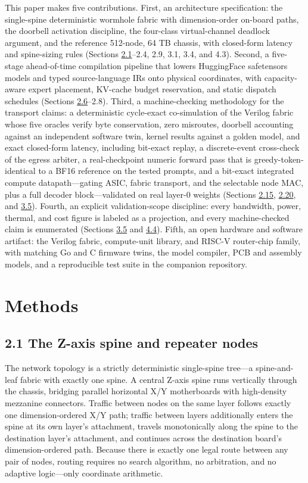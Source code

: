 \documentclass[12pt,onecolumn]{article}
\begin{document}
This paper makes five contributions. First, an architecture specification: the single-spine deterministic wormhole fabric with dimension-order on-board paths, the doorbell activation discipline, the four-class virtual-channel deadlock argument, and the reference 512-node, 64 TB chassis, with closed-form latency and spine-sizing rules (Sections \hyperref[sec:2.1]{2.1}--2.4, 2.9, 3.1, 3.4, and 4.3). Second, a five-stage ahead-of-time compilation pipeline that lowers HuggingFace safetensors models and typed source-language IRs onto physical coordinates, with capacity-aware expert placement, KV-cache budget reservation, and static dispatch schedules (Sections \hyperref[sec:2.6]{2.6}--2.8). Third, a machine-checking methodology for the transport claims: a deterministic cycle-exact co-simulation of the Verilog fabric whose five oracles verify byte conservation, zero misroutes, doorbell accounting against an independent software twin, kernel results against a golden model, and exact closed-form latency, including bit-exact replay, a discrete-event cross-check of the egress arbiter, a real-checkpoint numeric forward pass that is greedy-token-identical to a BF16 reference on the tested prompts, and a bit-exact integrated compute datapath---gating ASIC, fabric transport, and the selectable node MAC, plus a full decoder block---validated on real layer-0 weights (Sections \hyperref[sec:2.15]{2.15}, \hyperref[sec:2.20]{2.20}, and \hyperref[sec:3.5]{3.5}). Fourth, an explicit validation-scope discipline: every bandwidth, power, thermal, and cost figure is labeled as a projection, and every machine-checked claim is enumerated (Sections \hyperref[sec:3.5]{3.5} and \hyperref[sec:4.4]{4.4}). Fifth, an open hardware and software artifact: the Verilog fabric, compute-unit library, and RISC-V router-chip family, with matching Go and C firmware twins, the model compiler, PCB and assembly models, and a reproducible test suite in the companion repository\cite{28}.

\section*{Methods}\label{sec:methods}

\subsection*{2.1 The Z-axis spine and repeater nodes}\label{sec:2.1}

The network topology is a strictly deterministic single-spine tree---a spine-and-leaf fabric with exactly one spine. A central Z-axis spine runs vertically through the chassis, bridging parallel horizontal X/Y motherboards with high-density mezzanine connectors. Traffic between nodes on the same layer follows exactly one dimension-ordered X/Y path; traffic between layers additionally enters the spine at its own layer's attachment, travels monotonically along the spine to the destination layer's attachment, and continues across the destination board's dimension-ordered path. Because there is exactly one legal route between any pair of nodes, routing requires no search algorithm, no arbitration, and no adaptive logic---only coordinate arithmetic.
\end{document}
